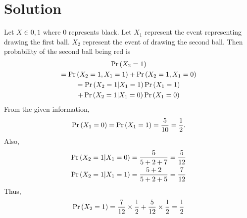\documentclass{article}
\begin{document}
\section*{\large Solution}
Let $X \in {0,1}$ where 0 represents black.  Let $X_1$ represent the event representing drawing the first ball. $X_2$ represent the event of drawing the second ball.
Then  probability of the second ball being red is
\begin{multline}
\Pr\left(X_2 = 1\right) 
\\
= \Pr\left(X_2 = 1,X_1 = 1\right)+\Pr\left(X_2 = 1,X_1 = 0\right)
\\
=\Pr\left(X_2 = 1|X_1 = 1\right)\Pr\left(X_1 = 1\right)
\\
+\Pr\left(X_2 = 1|X_1 = 0\right)\Pr\left(X_1 = 0\right)
\end{multline}
From the given information,
\begin{align}
\Pr\left(X_1 = 0\right) = \Pr\left(X_1 = 1\right)
=\frac{5}{10}=\frac{1}{2}.
\end{align}
Also, 
\begin{align}
\Pr\left(X_2 = 1|X_1 = 0\right) &= \frac{5}{5+2+7} = \frac{5}{12}
\\
\Pr\left(X_2 = 1|X_1 = 1\right) &= \frac{5+2}{5+2+5} = \frac{7}{12}
\end{align}
Thus, 
\begin{align}
\Pr\left(X_2 = 1\right) = \frac{7}{12}\times \frac{1}{2} 
+ \frac{5}{12}\times \frac{1}{2}
=\frac{1}{2}
\end{align}
\noindent{}
\end{document}
